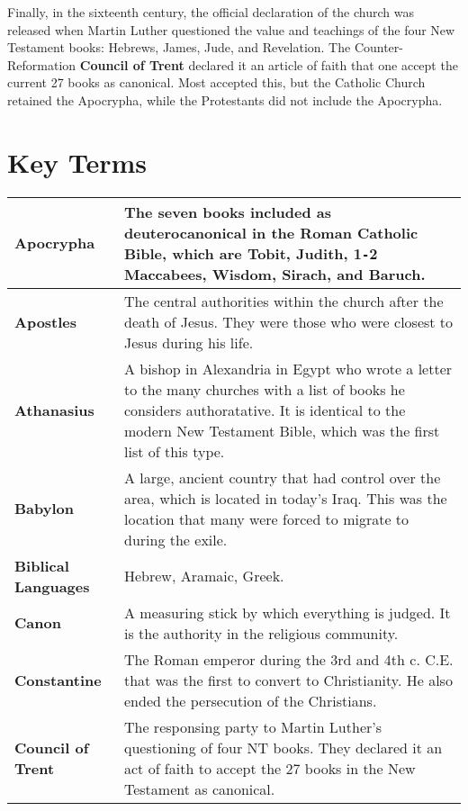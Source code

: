 \documentclass{report}
\begin{document}
        Finally, in the sixteenth century, the official declaration of the church was released when Martin Luther questioned the value and teachings of the four New Testament books: Hebrews, James, Jude, and Revelation. The Counter-Reformation \textbf{Council of Trent} declared it an article of faith that one accept the current 27 books as canonical. Most accepted this, but the Catholic Church retained the Apocrypha, while the Protestants did not include the Apocrypha.

        \section{Key Terms}
        \begin{center}
            \begin{longtable}{| p{5cm} | p{7cm} |}
            \hline
            \textbf{Apocrypha} & The seven books included as deuterocanonical in the Roman Catholic Bible, which are Tobit, Judith, 1\texttt{-}2 Maccabees, Wisdom, Sirach, and Baruch.\\ \hline
            \textbf{Apostles} & The central authorities within the church after the death of Jesus. They were those who were closest to Jesus during his life.\\ \hline
            \textbf{Athanasius} & A bishop in Alexandria in Egypt who wrote a letter to the many churches with a list of books he considers authoratative. It is identical to the modern New Testament Bible, which was the first list of this type.\\ \hline
            \textbf{Babylon} & A large, ancient country that had control over the area, which is located in today's Iraq. This was the location that many were forced to migrate to during the exile.\\ \hline
            \textbf{Biblical Languages} & Hebrew, Aramaic, Greek.\\ \hline
            \textbf{Canon} & A measuring stick by which everything is judged. It is the authority in the religious community.\\ \hline
            \textbf{Constantine} & The Roman emperor during the 3rd and 4th c. C.E. that was the first to convert to Christianity. He also ended the persecution of the Christians.\\ \hline
            \textbf{Council of Trent} & The responsing party to Martin Luther's questioning of four NT books. They declared it an act of faith to accept the 27 books in the New Testament as canonical.\\ \hline

\end{longtable}
\end{center}
\end{document}
